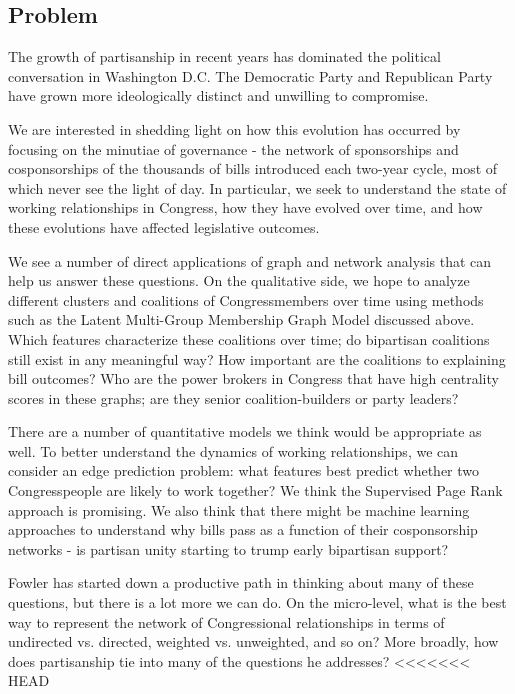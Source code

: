 \subsection{Problem}

The growth of partisanship in recent years has dominated the political conversation in Washington D.C. The Democratic Party and Republican Party have grown more ideologically distinct and unwilling to compromise. 

We are interested in shedding light on how this evolution has occurred by focusing on the minutiae of governance - the network of sponsorships and cosponsorships of the thousands of bills introduced each two-year cycle, most of which never see the light of day. In particular, we seek to understand the state of working relationships in Congress, how they have evolved over time, and how these evolutions have affected legislative outcomes.

We see a number of direct applications of graph and network analysis that can help us answer these questions. On the qualitative side, we hope to analyze different clusters and coalitions of Congressmembers over time using methods such as the Latent Multi-Group Membership Graph Model discussed above. Which features characterize these coalitions over time; do bipartisan coalitions still exist in any meaningful way? How important are the coalitions to explaining bill outcomes? Who are the power brokers in Congress that have high centrality scores in these graphs; are they senior coalition-builders or party leaders?

There are a number of quantitative models we think would be appropriate as well. To better understand the dynamics of working relationships, we can consider an edge prediction problem: what features best predict whether two Congresspeople are likely to work together? We think the Supervised Page Rank approach is promising. We also think that there might be machine learning approaches to understand why bills pass as a function of their cosponsorship networks - is partisan unity starting to trump early bipartisan support?

Fowler has started down a productive path in thinking about many of these questions, but there is a lot more we can do. On the micro-level, what is the best way to represent the network of Congressional relationships in terms of undirected vs. directed, weighted vs. unweighted, and so on? More broadly, how does partisanship tie into many of the questions he addresses?
<<<<<<< HEAD

